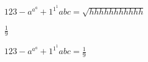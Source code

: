 \documentclass[parskip=full]{scrartcl}
\begin{document}

$123 - a^{a^a} + 1^{1^1} abc = \sqrt{hhhhhhhhhhh}$


$\frac{1}{9}$


$123 - a^{a^a} + 1^{1^1} abc = \frac{1}{9} $
\end{document}
